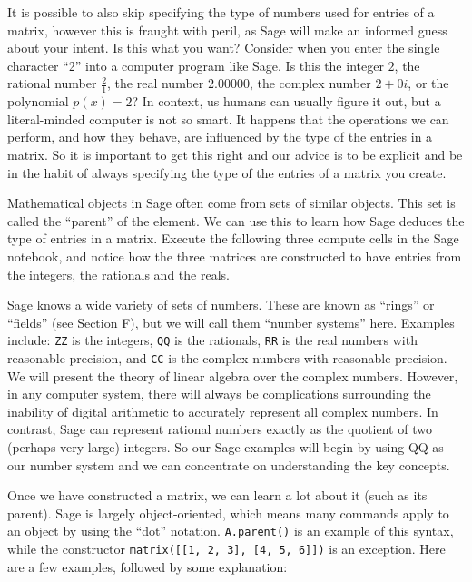 \documentclass[openany]{book}
\begin{document}
It is possible to also skip specifying the type of numbers used for
entries of a matrix, however this is fraught with peril, as Sage will
make an informed guess about your intent. Is this what you want?
Consider when you enter the single character ``2'' into a computer
program like Sage. Is this the integer \(2\), the rational number
\(\frac{2}{1}\), the real number \(2.00000\), the complex number
\(2 + 0i\), or the polynomial \(p(x)=2\)? In context, us humans can
usually figure it out, but a literal-minded computer is not so smart. It
happens that the operations we can perform, and how they behave, are
influenced by the type of the entries in a matrix. So it is important to
get this right and our advice is to be explicit and be in the habit of
always specifying the type of the entries of a matrix you create.

Mathematical objects in Sage often come from sets of similar objects.
This set is called the ``parent'' of the element. We can use this to
learn how Sage deduces the type of entries in a matrix. Execute the
following three compute cells in the Sage notebook, and notice how the
three matrices are constructed to have entries from the integers, the
rationals and the reals.

\begin{compute}
\end{compute}

\begin{compute}
\end{compute}

\begin{compute}
\end{compute}

Sage knows a wide variety of sets of numbers. These are known as
``rings'' or ``fields'' (see Section F), but we will call them ``number
systems'' here. Examples include: \texttt{ZZ} is the integers,
\texttt{QQ} is the rationals, \texttt{RR} is the real numbers with
reasonable precision, and \texttt{CC} is the complex numbers with
reasonable precision. We will present the theory of linear algebra over
the complex numbers. However, in any computer system, there will always
be complications surrounding the inability of digital arithmetic to
accurately represent all complex numbers. In contrast, Sage can
represent rational numbers exactly as the quotient of two (perhaps very
large) integers. So our Sage examples will begin by using QQ as our
number system and we can concentrate on understanding the key concepts.

Once we have constructed a matrix, we can learn a lot about it (such as
its parent). Sage is largely object-oriented, which means many commands
apply to an object by using the ``dot'' notation. \texttt{A.parent()} is
an example of this syntax, while the constructor
\texttt{matrix({[}{[}1,\ 2,\ 3{]},\ {[}4,\ 5,\ 6{]}{]})} is an
exception. Here are a few examples, followed by some explanation:
\end{document}
